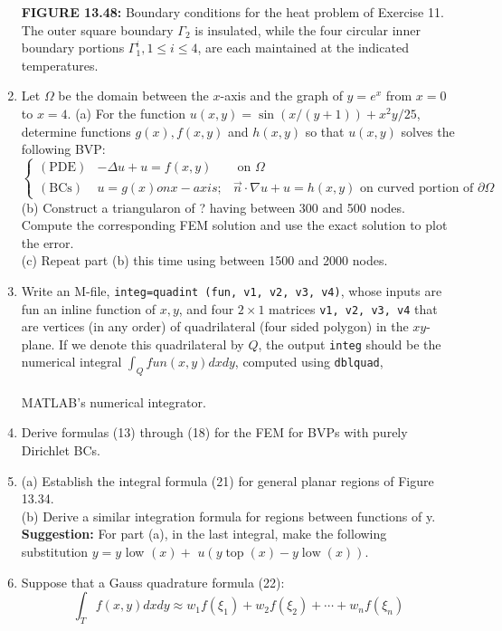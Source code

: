 \documentclass[../main.tex]{subfiles}
\begin{document}
\begin{enumerate}
\begin{figure}[H]
	\centering
	\label{pfig:ch13_35}
\end{figure}
\textbf{FIGURE 13.48:} Boundary conditions for the heat problem of Exercise 11. The outer square boundary $\Gamma_{2}$ is insulated, while the four circular inner boundary portions $\Gamma_{1}^{i}, 1 \leq i \leq 4$, are each maintained at the indicated temperatures.
	\item Let $\Omega$ be the domain between the $x$-axis and the graph of $y=e^{x}$ from $x=0$ to $x=4$.
(a) For the function $u(x, y)=\sin (x /(y+1))+x^{2} y / 25$, determine functions $g(x), f(x, y)$ and $h(x, y)$ so that $u(x, y)$ solves the following BVP:
	$$
\left\{\begin{array}{lll}
(\mathrm{PDE}) & -\Delta u+u=f(x,y) & \text { on } \Omega \\
(\mathrm{BCs}) & u=g(x)on x-axis; & \vec{n} \cdot \nabla u+u=h(x, y) \text { on curved portion of } \partial \Omega 
\end{array}\right.
$$
(b) Construct a triangularon of ? having between 300 and 500 nodes. Compute the 
corresponding FEM solution and use the exact solution to plot the error.\\ 
(c) Repeat part (b) this time using between 1500 and 2000 nodes. 
	\item Write an M-file, \texttt{integ=quadint (fun, v1, v2, v3, v4)}, whose inputs are fun an inline function of $x, y$, and four $2 \times 1$ matrices \texttt{v1, v2, v3, v4} that are vertices (in any order) of quadrilateral (four sided polygon) in the $x y$-plane. If we denote this quadrilateral by $Q$, the output \texttt{integ} should be the numerical integral $\int_{Q} f u n(x, y) d x d y$, computed using \texttt{dblquad},
\\
\\	
MATLAB's numerical integrator. 
	\item Derive formulas (13) through (18) for the FEM for BVPs with purely Dirichlet BCs. 
	\item (a) Establish the integral formula (21) for general planar regions of Figure 13.34. \\
(b) Derive a similar integration formula for regions between functions of y.\\
\textbf{Suggestion:} For part (a), in the last integral, make the following substitution $y=y$ low $(x)+$ $u(y \operatorname{top}(x)-y \operatorname{low}(x))$.
	\item Suppose that a Gauss quadrature formula (22):
	$$
\int_{T} f(x, y) d x d y \approx w_{1} f\left(\xi_{1}\right)+w_{2} f\left(\xi_{2}\right)+\cdots+w_{n} f\left(\xi_{n}\right)
$$
\end{enumerate}
\end{document}
